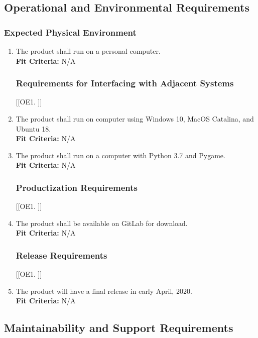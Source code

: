 \documentclass[12pt, titlepage]{article}
\begin{document}
\subsection{Operational and Environmental Requirements}

\subsubsection{Expected Physical Environment}
\begin{enumerate}[{OE}1. ]
    \item The product shall run on a personal computer.\\
    \textbf{Fit Criteria:} N/A

\subsubsection{Requirements for Interfacing with Adjacent Systems}
[{[{OE}1. ]}]
    \item The product shall run on computer using Windows 10, MacOS Catalina, and Ubuntu 18.\\
    \textbf{Fit Criteria:} N/A
    \item The product shall run on a computer with Python 3.7 and Pygame.\\
    \textbf{Fit Criteria:} N/A

\subsubsection{Productization Requirements}
[{[{OE}1. ]}]
    \item The product shall be available on GitLab for download.\\
    \textbf{Fit Criteria:} N/A

\subsubsection{Release Requirements}
[{[{OE}1. ]}]
    \item The product will have a final release in early April, 2020.\\
    \textbf{Fit Criteria:} N/A
\end{enumerate}



\subsection{Maintainability and Support Requirements}
\end{document}
